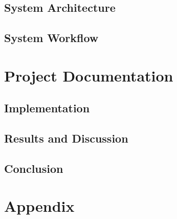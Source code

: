 \documentclass[a4paper,12pt]{report}
\begin{document}
\section{System Architecture}

\section{System Workflow}

\chapter{Project Documentation}
\section{Implementation}

\section{Results and Discussion}

\section{Conclusion}

\newpage
\appendix
\chapter{Appendix}
\end{document}
